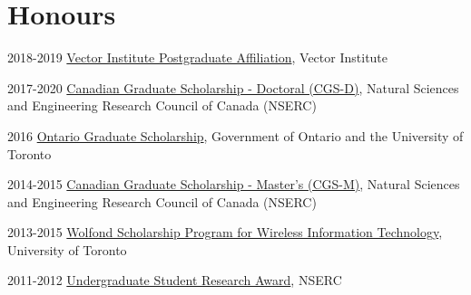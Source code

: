\documentclass{article}
\begin{document}
\section{Honours}
\begin{CV}
  \item[2018-2019] \href{https://vectorinstitute.ai/2018/02/01/vector-institute-launches-inaugural-postgraduate-affiliate-program-2/}
    {Vector Institute Postgraduate Affiliation}, Vector Institute

  \item[2017-2020] \href{http://www.nserc-crsng.gc.ca/Students-Etudiants/PG-CS/BellandPostgrad-BelletSuperieures_eng.asp}
    {Canadian Graduate Scholarship - Doctoral (CGS-D)}, Natural Sciences and
    Engineering Research Council of Canada (NSERC)

  \item[2016] \href{https://osap.gov.on.ca/OSAPPortal/en/A-ZListofAid/PRDR013089.html}
    {Ontario Graduate Scholarship}, Government of Ontario and the University of
    Toronto

  \item[2014-2015] \href{http://www.nserc-crsng.gc.ca/Students-Etudiants/PG-CS/CGSM-BESCM_eng.asp}
    {Canadian Graduate Scholarship - Master's (CGS-M)}, Natural Sciences and
    Engineering Research Council of Canada (NSERC)

  \item[2013-2015] \href{http://www.artsci.utoronto.ca/graduate/scholarships-awards/scholarships-by-department/computer-science}
    {Wolfond Scholarship Program for Wireless Information Technology},
    University of Toronto

  \item[2011-2012] \href{http://www.nserc-crsng.gc.ca/Students-Etudiants/UG-PC/USRA-BRPC_eng.asp}
    {Undergraduate Student Research Award}, NSERC

\end{CV}
\end{document}
